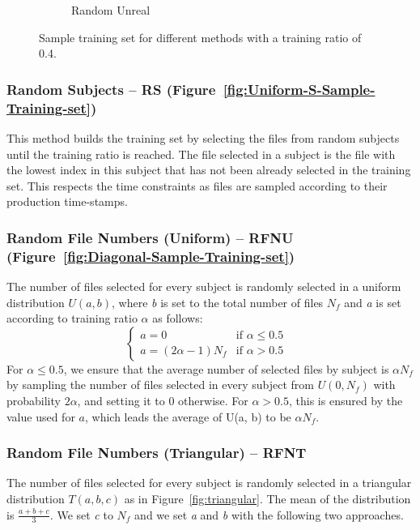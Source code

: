 \documentclass[10pt, conference, compsocconf]{IEEEtran}
\begin{document}
\begin{figure}[h!]
\begin{subfigure}[b]{\columnwidth}
                  \caption{Random Unreal}
                  \label{fig:Random-Unreal-Sample-Training-set}
        \end{subfigure}
        \caption{Sample training set for different methods with a training ratio of 0.4.}
        \label{fig:sampling}
\end{figure}

\subsubsection{Random Subjects -- RS 
(Figure~\ref{fig:Uniform-S-Sample-Training-set})} This method builds 
the training set by selecting the files from random subjects until the 
training ratio is reached. The file selected in a subject is the file 
with the lowest index in this subject that has not been already 
selected in the training set. This respects the time constraints as files are 
sampled according to their production time-stamps.

\subsubsection{Random File Numbers (Uniform) -- RFNU (Figure~\ref{fig:Diagonal-Sample-Training-set})}
The number of files selected for every subject is randomly selected in
a uniform distribution $U(\textit{a},\textit{b})$, where \textit{b} is set to the total
number of files $N_{f}$ and \textit{a} is set according to training ratio $\alpha$ as follows:
\[
  \begin{cases}
          \textit{a} = 0      & \text{if $\alpha \leq 0.5$ }\\
          
          \textit{a} = (2\alpha - 1) N_{f} & \text{if $\alpha > 0.5$}
  \end{cases}
\]
 For $\alpha \leq 0.5$, we ensure that the average number of selected 
 files by subject is $\alpha N_f$ by sampling the number of 
 files selected in every subject from $U(0,N_f)$ with 
 probability $2\alpha$, and setting it to 0 otherwise. For $\alpha > 
 0.5$, this is ensured by the value used for $a$, which leads the 
 average of U(a, b) to be $\alpha N_f$.

\subsubsection{Random File Numbers (Triangular) -- RFNT}
The number of files selected for every subject is randomly selected in
a triangular distribution $T(a, b, c)$ as in Figure~\ref{fig:triangular}. The mean of the distribution is 
$\frac{a+b+c}{3}$. We set \textit{c} to $N_{f}$ and we set 
\textit{a} and \textit{b} with the following two approaches.
\end{document}
